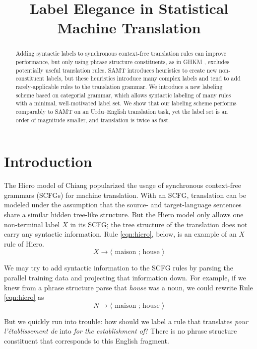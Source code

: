 \documentclass[a4paper]{article}
\author{
\anonymize{
Jonathan Weese \and Chris Callison-Burch \and Adam Lopez\\
Department of Computer Science\\
Human Language Technology Center of Excellence\\ %
Johns Hopkins University\\
Baltimore, MD 21218 USA\\
{\tt \{jonny,ccb,alopez\}@cs.jhu.edu}}
}
\title{Label Elegance in Statistical Machine Translation}
\begin{document}
\maketitle

\begin{abstract}
Adding syntactic labels to synchronous context-free translation rules can improve performance, but only using phrase structure constituents, as in GHKM \cite{ghkm}, excludes potentially useful translation rules. SAMT \cite{samt-wmt06} introduces heuristics to create new non-constituent labels, but these heuristics introduce many complex labels and tend to add rarely-applicable rules to the translation grammar. We introduce a new labeling scheme based on categorial grammar, which allows syntactic labeling of many rules with a minimal, well-motivated label set. We show that our labeling scheme performs comparably to SAMT on an Urdu--English translation task, yet the label set is an order of magnitude smaller, and translation is twice as fast.
\end{abstract}

\section{Introduction}

The Hiero model of Chiang  popularized the usage of synchronous context-free grammars (SCFGs) for machine translation. With an SCFG, translation can be modeled under the assumption that the source- and target-language sentences share a similar hidden tree-like structure. But the Hiero model only allows one non-terminal label $X$ in its SCFG; the tree structure of the translation does not carry any syntactic information. Rule \ref{eqn:hiero}, below, is an example of an $X$ rule of Hiero.
\begin{equation}
X \to \langle \textrm{ maison ; house } \rangle\label{eqn:hiero}
\end{equation}

We may try to add syntactic information to the SCFG rules by parsing the parallel training data and projecting that information down. For example, if we knew from a phrase structure parse that {\em house} was a noun, we could rewrite Rule \ref{eqn:hiero} as
\begin{equation*}
N \to \langle \textrm{ maison ; house } \rangle
\end{equation*}

But we quickly run into trouble: how should we label a rule that translates {\em pour l'\'{e}tablissement de} into {\em for the establishment of}? There is no phrase structure constituent that corresponds to this English fragment.
\end{document}
